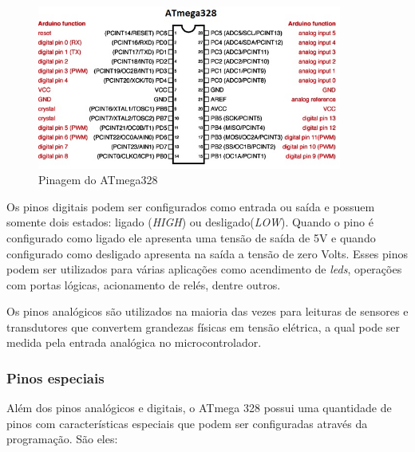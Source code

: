 \begin{figure}[h]

\center

\includegraphics[width=10cm]{imagens/pinagematmega.jpg}

\label{Pinagem do ATmega328}

\caption{Pinagem do ATmega328}

\end{figure}
Os pinos digitais podem ser configurados como entrada ou saída e possuem somente dois estados: ligado (\textit{HIGH}) ou desligado(\textit{LOW}). Quando o pino é configurado como ligado ele apresenta uma tensão de saída de 5V e quando configurado como desligado apresenta na saída a tensão de zero Volts. Esses pinos podem ser utilizados para várias aplicações como acendimento de \textit{leds}, operações com portas lógicas, acionamento de relés, dentre outros.

Os pinos analógicos são utilizados na maioria das vezes para leituras de sensores e transdutores que convertem grandezas físicas em tensão elétrica, a qual pode ser medida pela entrada analógica no microcontrolador.

\subsubsection{Pinos especiais}

Além dos pinos analógicos e digitais, o ATmega 328 possui uma quantidade de pinos com características especiais que podem ser configuradas através da programação. São eles:

